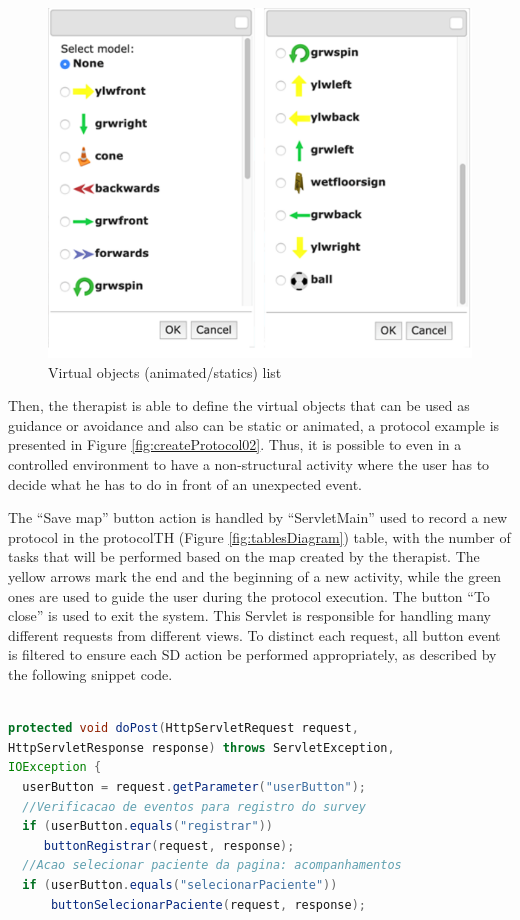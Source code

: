 \begin{figure}[!hbt]
\begin{center}
\includegraphics[width=0.6\linewidth]{img/cap5/virtualObjects}
\caption{Virtual objects (animated/statics) list} \label{fig:virtualObjects}
\end{center}
\end{figure}

Then, the therapist is able to define the virtual objects that can be used as guidance or avoidance and also can be static or animated, a protocol example is presented in Figure \ref{fig:createProtocol02}. Thus, it is possible to even in a controlled environment to have a non-structural activity where the user has to decide what he has to do in front of an unexpected event.

The  ``Save map'' button action is handled by ``ServletMain'' used to record a new protocol in the protocolTH (Figure \ref{fig:tablesDiagram}) table, with the number of tasks that will be performed based on the map created by the therapist. The yellow arrows mark the end and the beginning of a new activity, while the green ones are used to guide the user during the protocol execution. The button  ``To close'' is used to exit the system. This Servlet is responsible for handling many different requests from different views. To distinct each request, all button event is filtered to ensure each SD action be performed appropriately, as described by the following snippet code.\newline


\begin{lstlisting}[frame=single,language=Java]  % Start your code-block

protected void doPost(HttpServletRequest request, 
HttpServletResponse response) throws ServletException, 
IOException {
  userButton = request.getParameter("userButton");
  //Verificacao de eventos para registro do survey
  if (userButton.equals("registrar"))
     buttonRegistrar(request, response);
  //Acao selecionar paciente da pagina: acompanhamentos
  if (userButton.equals("selecionarPaciente"))
      buttonSelecionarPaciente(request, response);
\end{lstlisting}

